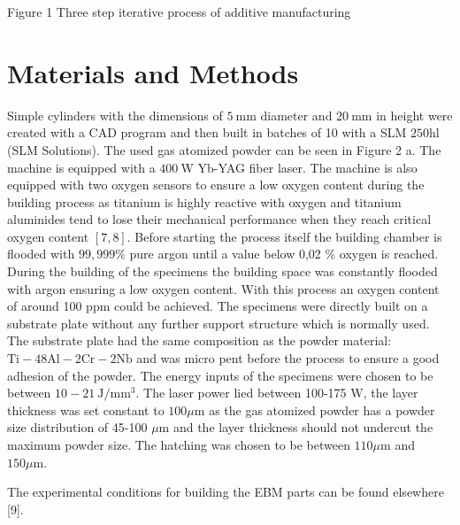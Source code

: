 \documentclass[10pt]{article}
\begin{document}
Figure 1 Three step iterative process of additive manufacturing

\section*{Materials and Methods}
Simple cylinders with the dimensions of $5 \mathrm{~mm}$ diameter and $20 \mathrm{~mm}$ in height were created with a CAD program and then built in batches of 10 with a SLM $250 \mathrm{hl}$ (SLM Solutions). The used gas atomized powder can be seen in Figure 2 a. The machine is equipped with a $400 \mathrm{~W}$ Yb-YAG fiber laser. The machine is also equipped with two oxygen sensors to ensure a low oxygen content during the building process as titanium is highly reactive with oxygen and titanium aluminides tend to lose their mechanical performance when they reach critical oxygen content $[7,8]$. Before starting the process itself the building chamber is flooded with $99,999 \%$ pure argon until a value below 0,02 \% oxygen is reached. During the building of the specimens the building space was constantly flooded with argon ensuring a low oxygen content. With this process an oxygen content of around 100 ppm could be achieved. The specimens were directly built on a substrate plate without any further support structure which is normally used. The substrate plate had the same composition as the powder material: $\mathrm{Ti}-48 \mathrm{Al}-2 \mathrm{Cr}-2 \mathrm{Nb}$ and was micro pent before the process to ensure a good adhesion of the powder. The energy inputs of the specimens were chosen to be between $10-21 \mathrm{~J} / \mathrm{mm}^{3}$. The laser power lied between 100-175 $\mathrm{W}$, the layer thickness was set constant to $100 \mu \mathrm{m}$ as the gas atomized powder has a powder size distribution of 45-100 $\mu \mathrm{m}$ and the layer thickness should not undercut the maximum powder size. The hatching was chosen to be between $110 \mu \mathrm{m}$ and $150 \mu \mathrm{m}$.

The experimental conditions for building the EBM parts can be found elsewhere [9].
\end{document}
